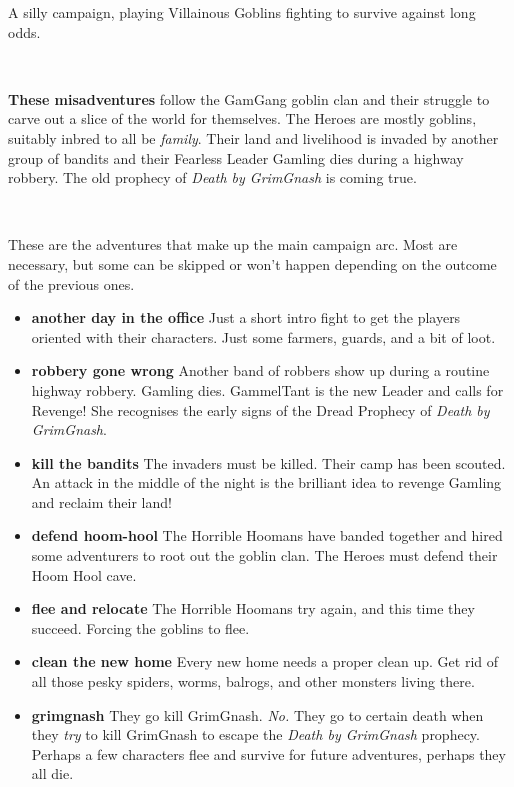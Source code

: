 A silly campaign, playing Villainous Goblins fighting to survive against long odds.

\

\noindent \textbf{These misadventures} follow the GamGang goblin clan and their struggle to carve out a slice of the world for themselves. The Heroes are mostly goblins, suitably inbred to all be \emph{family}. Their land and livelihood is invaded by another group of bandits and their Fearless Leader Gamling dies during a highway robbery. The old prophecy of \emph{Death by GrimGnash} is coming true.

\

\tableofcontents                              %

\vspace{4\baselineskip}


These are the adventures that make up the main campaign arc. Most are necessary, but some can be skipped or won't happen depending on the outcome of the previous ones.

\begin{itemize}

    \item \textbf{another day in the office} Just a short intro fight to get the players oriented with their characters. Just some farmers, guards, and a bit of loot.

    \item \textbf{robbery gone wrong} Another band of robbers show up during a routine highway robbery. Gamling dies. GammelTant is the new Leader and calls for Revenge! She recognises the early signs of the Dread Prophecy of \emph{Death by GrimGnash}.

    \item \textbf{kill the bandits} The invaders must be killed. Their camp has been scouted. An attack in the middle of the night is the brilliant idea to revenge Gamling and reclaim their land!

    \item \textbf{defend hoom-hool} The Horrible Hoomans have banded together and hired some adventurers to root out the goblin clan. The Heroes must defend their Hoom Hool cave.

    \item \textbf{flee and relocate} The Horrible Hoomans try again, and this time they succeed. Forcing the goblins to flee.

    \item \textbf{clean the new home} Every new home needs a proper clean up. Get rid of all those pesky spiders, worms, balrogs, and other monsters living there.

    \item \textbf{grimgnash} They go kill GrimGnash. \emph{No.} They go to certain death when they \emph{try} to kill GrimGnash to escape the \emph{Death by GrimGnash} prophecy. Perhaps a few characters flee and survive for future adventures, perhaps they all die.

\end{itemize}

